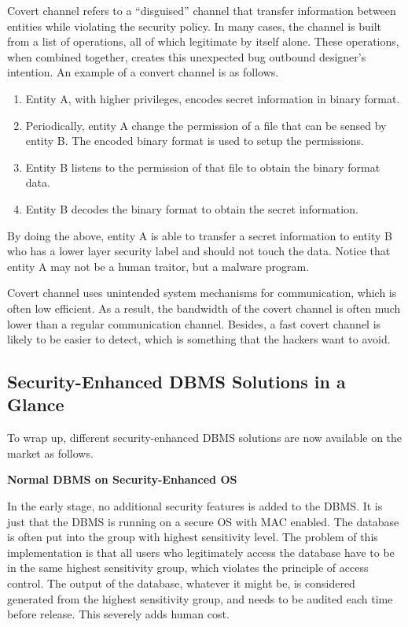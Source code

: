 Covert channel refers to a ``disguised'' channel that transfer information between entities while violating the security policy. In many cases, the channel is built from a list of operations, all of which legitimate by itself alone. These operations, when combined together, creates this unexpected bug outbound designer's intention. An example of a convert channel is as follows.
\begin{enumerate}
  \item Entity A, with higher privileges, encodes secret information in binary format.
  \item Periodically, entity A change the permission of a file that can be sensed by entity B. The encoded binary format is used to setup the permissions.
  \item Entity B listens to the permission of that file to obtain the binary format data.
  \item Entity B decodes the binary format to obtain the secret information.
\end{enumerate}
By doing the above, entity A is able to transfer a secret information to entity B who has a lower layer security label and should not touch the data. Notice that entity A may not be a human traitor, but a malware program.

Covert channel uses unintended system mechanisms for communication, which is often low efficient. As a result, the bandwidth of the covert channel is often much lower than a regular communication channel. Besides, a fast covert channel is likely to be easier to detect, which is something that the hackers want to avoid.

\subsection{Security-Enhanced DBMS Solutions in a Glance}

To wrap up, different security-enhanced DBMS solutions are now available on the market as follows.

\vspace{0.1in}
\noindent \textbf{Normal DBMS on Security-Enhanced OS}
\vspace{0.1in}

In the early stage, no additional security features is added to the DBMS. It is just that the DBMS is running on a secure OS with MAC enabled. The database is often put into the group with highest sensitivity level. The problem of this implementation is that all users who legitimately access the database have to be in the same highest sensitivity group, which violates the principle of access control. The output of the database, whatever it might be, is considered generated from the highest sensitivity group, and needs to be audited each time before release. This severely adds human cost.

